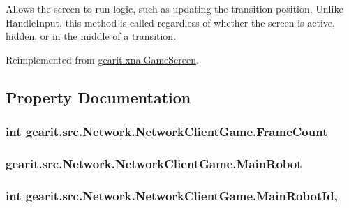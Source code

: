 Allows the screen to run logic, such as updating the transition position. Unlike Handle\+Input, this method is called regardless of whether the screen is active, hidden, or in the middle of a transition. 



Reimplemented from \hyperlink{classgearit_1_1xna_1_1_game_screen_a6bb803502dfbd62b275c2a21d182f88e}{gearit.\+xna.\+Game\+Screen}.



\subsection{Property Documentation}
\hypertarget{classgearit_1_1src_1_1_network_1_1_network_client_game_a17d4e2d447ad8d5e224d4bedb584b034}{
\subsubsection[{Frame\+Count}]{\setlength{\rightskip}{0pt plus 5cm}int gearit.\+src.\+Network.\+Network\+Client\+Game.\+Frame\+Count\hspace{0.3cm}{\ttfamily [get]}}}\label{classgearit_1_1src_1_1_network_1_1_network_client_game_a17d4e2d447ad8d5e224d4bedb584b034}
\hypertarget{classgearit_1_1src_1_1_network_1_1_network_client_game_a9a4c5981b88db35f5c2b8fd51dc8cbae}{
\subsubsection[{Main\+Robot}]{ gearit.\+src.\+Network.\+Network\+Client\+Game.\+Main\+Robot\hspace{0.3cm}{\ttfamily [get]}}}\label{classgearit_1_1src_1_1_network_1_1_network_client_game_a9a4c5981b88db35f5c2b8fd51dc8cbae}
\hypertarget{classgearit_1_1src_1_1_network_1_1_network_client_game_af731a5a4f8858cdb8bd883517f66b3ba}{
\subsubsection[{Main\+Robot\+Id}]{\setlength{\rightskip}{0pt plus 5cm}int gearit.\+src.\+Network.\+Network\+Client\+Game.\+Main\+Robot\+Id\hspace{0.3cm}{\ttfamily [get]}, {\ttfamily [set]}}}\label{classgearit_1_1src_1_1_network_1_1_network_client_game_af731a5a4f8858cdb8bd883517f66b3ba}
